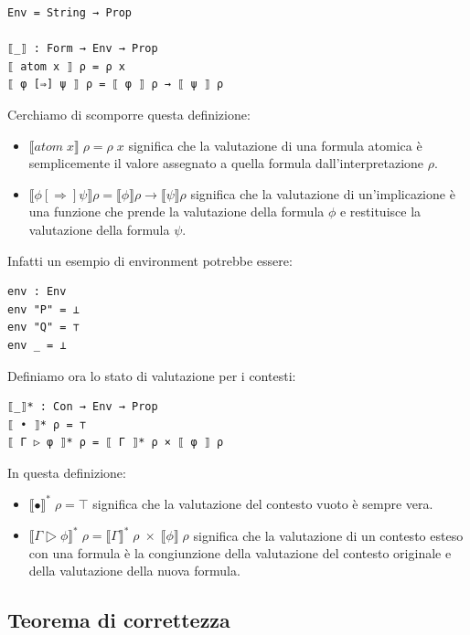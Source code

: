 \documentclass[a4paper]{article}
\theoremstyle{definition}
\theoremstyle{remark}
\begin{document}
\begin{verbatim}
Env = String → Prop

⟦_⟧ : Form → Env → Prop
⟦ atom x ⟧ ρ = ρ x
⟦ φ [⇒] ψ ⟧ ρ = ⟦ φ ⟧ ρ → ⟦ ψ ⟧ ρ
\end{verbatim}
Cerchiamo di scomporre questa definizione:
\begin{itemize}
  \item $\llbracket atom \; x \rrbracket \; \rho = \rho \; x$ significa che la valutazione di una formula atomica è semplicemente il valore assegnato a quella formula dall'interpretazione $\rho$.
  \item $\llbracket \phi [⇒] \psi \rrbracket \rho = \llbracket \phi \rrbracket \rho \to \llbracket \psi \rrbracket \rho$ significa che la valutazione di un'implicazione è una funzione che 
  prende la valutazione della formula $\phi$ e restituisce la valutazione della formula $\psi$.
\end{itemize}
Infatti un esempio di environment potrebbe essere:
\begin{verbatim}
env : Env 
env "P" = ⊥
env "Q" = ⊤
env _ = ⊥
\end{verbatim}
Definiamo ora lo stato di valutazione per i contesti:
\begin{verbatim}
⟦_⟧* : Con → Env → Prop
⟦ • ⟧* ρ = ⊤
⟦ Γ ▷ φ ⟧* ρ = ⟦ Γ ⟧* ρ × ⟦ φ ⟧ ρ
\end{verbatim}
In questa definizione:
\begin{itemize}
  \item $\llbracket • \rrbracket^* \; \rho = \top$ significa che la valutazione del contesto vuoto è sempre vera.
  \item $\llbracket \Gamma ▷ \phi \rrbracket^* \; \rho = \llbracket \Gamma \rrbracket^* \; \rho \; \times \; \llbracket \phi \rrbracket \; \rho$ significa che la valutazione di un contesto esteso con una formula è la congiunzione della valutazione del contesto originale e della valutazione della nuova formula.
\end{itemize}

\subsection{Teorema di correttezza}
\end{document}
